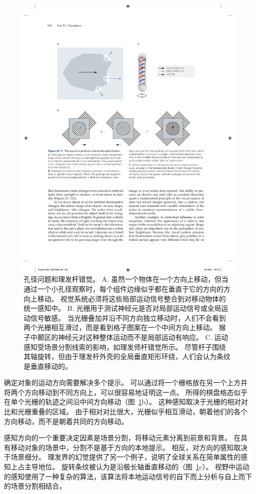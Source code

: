 \begin{figure}[htbp]
	\centering
	\includegraphics[width=0.8\linewidth]{chap23/fig_23_11}
	\caption{孔径问题和理发杆错觉。
		A. 虽然一个物体在一个方向上移动，但当通过一个小孔径观察时，每个组件边缘似乎都在垂直于它的方向的方向上移动。
		视觉系统必须将这些局部运动信号整合到对移动物体的统一感知中。
		B. 光栅用于测试神经元是否对局部运动信号或全局运动信号敏感。
		当光栅叠加并沿不同方向独立移动时，人们不会看到两个光栅相互滑过，而是看到格子图案在一个中间方向上移动。
		猴子中颞区的神经元对这种整体运动而不是局部运动有响应。
		C. 运动感知受场景分割线索的影响，如理发师杆错觉所示。
		尽管杆子围绕其轴旋转，但由于理发杆外壳的全局垂直矩形环绕，人们会认为条纹是垂直移动的。}
	\label{fig:23_11}
\end{figure}


确定对象的运动方向需要解决多个提示。
可以通过将一个栅格放在另一个上方并将两个方向移动到不同方向上，可以很容易地证明这一点。
所得的棋盘格态似乎在单个光栅的轨迹之间沿中间方向移动（图~\ref{fig:23_11}b）。
这种感知取决于光栅的相对对比和光栅重叠的区域。
由于相对对比很大，光栅似乎相互滑动，朝着他们的各个方向移动，而不是朝着共同的方向移动。


感知方向的一个重要决定因素是场景分割，将移动元素分离到前景和背景。
在具有移动对象的场景中，分割不是基于方向的本地提示。
相反，对方向的感知取决于场景细分。
理发界的幻觉提供了另一个例子，说明了全球关系在简单属性的感知上占主导地位。
旋转条纹被认为是沿极长轴垂直移动的（图~\ref{fig:23_11}c）。
视野中运动的感知使用了一种复杂的算法，该算法将本地运动信号的自下而上分析与自上而下的场景分割相结合。


